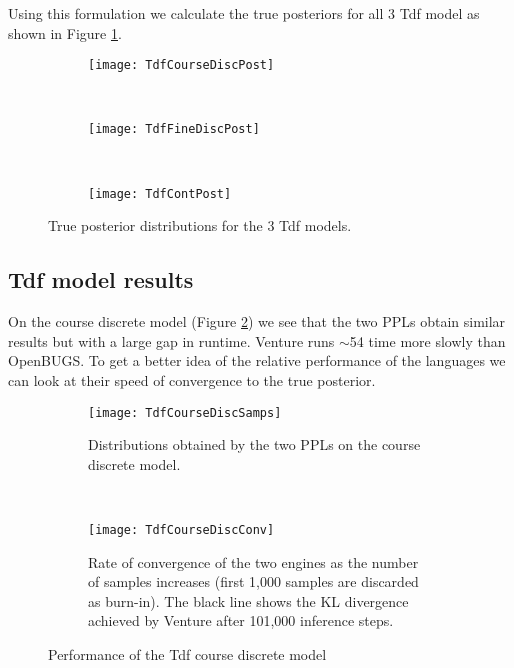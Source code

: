 Using this formulation we calculate the true posteriors for all 3 Tdf model as shown in Figure \ref{fig:tdfPosts}.

\begin{figure}[h]
        \centering
        \begin{subfigure}[b]{0.31\textwidth}
                \centering
                \texttt{[image: TdfCourseDiscPost]}
        \end{subfigure}
        ~ 
        \begin{subfigure}[b]{0.31\textwidth}
                \centering
                \texttt{[image: TdfFineDiscPost]}
        \end{subfigure}
        ~ 
        \begin{subfigure}[b]{0.31\textwidth}
                \centering
                \texttt{[image: TdfContPost]}
        \end{subfigure}
    \caption{True posterior distributions for the 3 Tdf models.}
    \label{fig:tdfPosts}
\end{figure}

\subsection{Tdf model results}

On the course discrete model (Figure \ref{fig:tdfCourseDiscSamp}) we see that the two PPLs obtain similar results but with a large gap in runtime. Venture runs $\sim$54 time more slowly than OpenBUGS. To get a better idea of the relative performance of the languages we can look at their speed of convergence to the true posterior.

\begin{figure}[h]
    \centering
    \begin{subfigure}[t]{0.48\textwidth}
      \texttt{[image: TdfCourseDiscSamps]}
      \caption{Distributions obtained by the two PPLs on the course discrete model.}
      \label{fig:tdfCourseDiscSamp}
    \end{subfigure}
    ~
    \begin{subfigure}[t]{0.48\textwidth}
      \texttt{[image: TdfCourseDiscConv]}
      \caption{Rate of convergence of the two engines as the number of samples increases (first 1,000 samples are discarded as burn-in). The black line shows the KL divergence achieved by Venture after 101,000 inference steps.}
      \label{fig:tdfCourseDiscConv}
    \end{subfigure}
    \caption{Performance of the Tdf course discrete model}
\end{figure}

